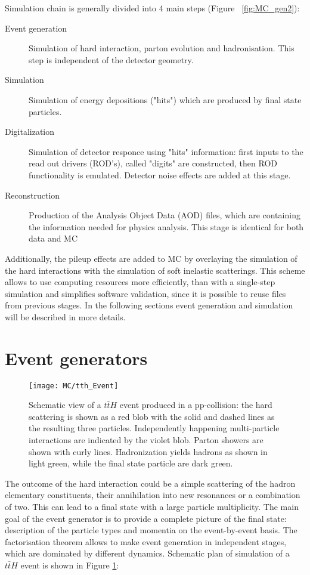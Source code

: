 Simulation chain is generally divided into 4 main steps (Figure ~\ref{fig:MC_gen2}):
\begin{description}
\item[Event generation]Simulation of hard interaction, parton evolution and hadronisation. This step is independent of the \atlas detector geometry.
\item[Simulation]Simulation of energy depositions ("hits") which are produced by final state particles.
\item[Digitalization] Simulation of detector responce using "hits" information:  first inputs to the read out drivers (ROD's), called "digits" are constructed, then ROD functionality is emulated. Detector noise effects are added at this stage. 
\item[Reconstruction] Production of the Analysis Object Data (AOD) files, which are containing the information needed for physics analysis. This stage is identical for both data and MC
\end{description}
Additionally, the pileup effects are added to MC by overlaying the simulation of the hard interactions with the simulation of soft inelastic scatterings. This scheme allows to use computing resources more efficiently, than with a single-step simulation and simplifies software validation, since it is possible to reuse files from previous stages. In the following sections event generation and simulation will be described in more details.

\section{Event generators}

\begin{figure}[!t]
\begin{center}
\texttt{[image: MC/tth\_Event]}
\end{center}
\caption{Schematic view of a $t\bar{t}H$ event produced in a pp-collision: the hard scattering is shown as a red blob with the solid and dashed lines as the resulting three particles.
Independently happening multi-particle interactions are indicated by the violet blob. 
Parton showers are shown with curly lines.
Hadronization yields hadrons as shown in light green, while the final state particle are dark green.\cite{MC:ttHSketch}
}
\label{fig:MC_ttH}
\end{figure}

The outcome of the hard interaction could be a simple scattering of the hadron elementary constituents, their annihilation into new resonances or a combination of two. This can lead to a final state with a large particle multiplicity. The main goal of the event generator is to provide a complete picture of the final state: description of the particle types and momentia on  the event-by-event basis. The factorisation theorem \cite{Factorisation} allows to make event generation in independent stages, which are dominated by different dynamics. Schematic plan of simulation of a $t\bar{t}H$ event is shown in Figure \ref{fig:MC_ttH}:

